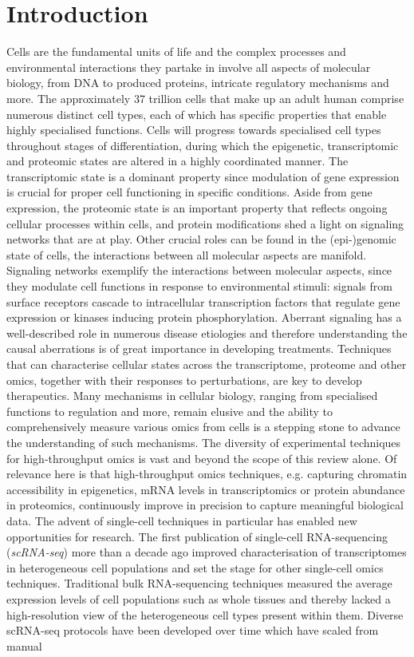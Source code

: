 \documentclass[times, twoside, watermark]{zHenriquesLab-StyleBioRxiv}
\begin{document}
\section*{Introduction}
Cells are the fundamental units of life and the complex processes and environmental interactions they partake in involve all aspects of molecular biology, from DNA to produced proteins, intricate regulatory mechanisms and more. The approximately 37 trillion cells that make up an adult human \cite{Bianconi2013} comprise numerous distinct cell types, each of which has specific properties that enable highly specialised functions. Cells will progress towards specialised cell types throughout stages of differentiation, during which the epigenetic, transcriptomic and proteomic states are altered in a highly coordinated manner. The transcriptomic state is a dominant property since modulation of gene expression is crucial for proper cell functioning in specific conditions. Aside from gene expression, the proteomic state is an important property that reflects ongoing cellular processes within cells, and protein modifications shed a light on signaling networks that are at play. Other crucial roles can be found in the (epi-)genomic state of cells, the interactions between all molecular aspects are manifold. \newline Signaling networks exemplify the interactions between molecular aspects, since they modulate cell functions in response to environmental stimuli: signals from surface receptors cascade to intracellular transcription factors that regulate gene expression or kinases inducing protein phosphorylation. Aberrant signaling has a well-described role in numerous disease etiologies and therefore understanding the causal aberrations is of great importance in developing treatments. Techniques that can characterise cellular states across the transcriptome, proteome and other omics, together with their responses to perturbations, are key to develop therapeutics. Many mechanisms in cellular biology, ranging from specialised functions to regulation and more, remain elusive and the ability to comprehensively measure various omics from cells is a stepping stone to advance the understanding of such mechanisms. \newline The diversity of experimental techniques for high-throughput omics is vast and beyond the scope of this review alone. Of relevance here is that high-throughput omics techniques, e.g. capturing chromatin accessibility in epigenetics, mRNA levels in transcriptomics or protein abundance in proteomics, continuously improve in precision to capture meaningful biological data. The advent of single-cell techniques in particular has enabled new opportunities for research. The first publication of single-cell RNA-sequencing (\textit{scRNA-seq}) more than a decade ago \cite{Tang2009} improved characterisation of transcriptomes in heterogeneous cell populations and set the stage for other single-cell omics techniques. Traditional bulk RNA-sequencing techniques measured the average expression levels of cell populations such as whole tissues and thereby lacked a high-resolution view of the heterogeneous cell types present within them. Diverse scRNA-seq protocols have been developed over time which have scaled from manual 
\end{document}
